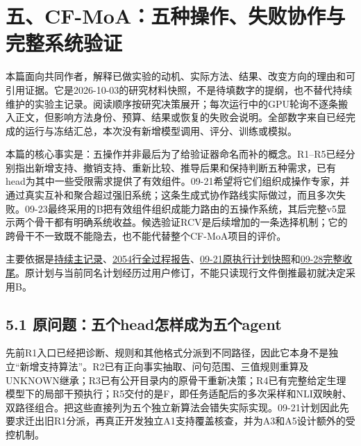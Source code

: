 \documentclass[
  11pt,
  a4paper,
]{article}
\begin{document}
\section{五、CF-MoA：五种操作、失败协作与完整系统验证}\label{ux4e94cf-moaux4e94ux79cdux64cdux4f5cux5931ux8d25ux534fux4f5cux4e0eux5b8cux6574ux7cfbux7edfux9a8cux8bc1}

本篇面向共同作者，解释已做实验的动机、实际方法、结果、改变方向的理由和可引用证据。它是2026-10-03的研究材料快照，不是待填数字的提纲，也不替代持续维护的实验主记录。阅读顺序按研究决策展开；每次运行中的GPU轮询不逐条搬入正文，但影响方法身份、预算、结果或恢复的失败会说明。全部数字来自已经完成的运行与冻结汇总，本次没有新增模型调用、评分、训练或模拟。

本篇的核心事实是：五操作并非最后为了给验证器命名而补的概念。R1--R5已经分别指出新增支持、撤销支持、重新比较、推导后果和保持判断五种需求，已有head为其中一些受限需求提供了有效组件。09-21希望将它们组织成操作专家，并通过真实互补和聚合超过强旧系统；这条生成式协作路线实际做过，而且多次失败。09-23最终采用的B把有效组件组织成能力路由的五操作系统，其后完整v5显示两个骨干都有明确系统收益。候选验证RCV是后续增加的一条选择机制；它的跨骨干不一致既不能隐去，也不能代替整个CF-MoA项目的评价。

主要依据是\href{https://github.com/xiotakut/cf_mrg/blob/main/papers/2026-10-02_cf_moa/author_dossier/records/research/cf_moa.md}{持续主记录}、\href{https://github.com/xiotakut/cf_mrg/blob/main/papers/2026-10-02_cf_moa/author_dossier/records/research/cf_moa_experiment_report.md}{2054行全过程报告}、\href{https://github.com/xiotakut/cf_mrg/blob/main/papers/2026-10-02_cf_moa/author_dossier/sources/4d27d8ddefd6_CF_MED_MoA_Router_Five_Agents_Execution_Plan.md}{09-21原执行计划快照}和\href{https://github.com/xiotakut/cf_mrg/blob/main/papers/2026-10-02_cf_moa/author_dossier/sources/f4ec6b995121_README.md}{09-28完整收尾}。原计划与当前同名计划经历过用户修订，不能只读现行文件倒推最初就决定采用B。

\subsection{5.1
原问题：五个head怎样成为五个agent}\label{ux539fux95eeux9898ux4e94ux4e2aheadux600eux6837ux6210ux4e3aux4e94ux4e2aagent}

先前R1入口已经把诊断、规则和其他格式分派到不同路径，因此它本身不是独立``新增支持算法''。R2已有正向事实抽取、问句范围、三值规则重算及UNKNOWN继承；R3已有公开目录内的原骨干重新决策；R4已有完整给定生理模型下的局部干预执行；R5交付的是F，即任务适配后的多次采样和NLI双映射、双路径组合。把这些直接列为五个独立新算法会错失实际实现。09-21计划因此先要求迁出旧R1分派，再真正开发独立A1支持覆盖核查，并为A3和A5设计额外的受控机制。
\end{document}
